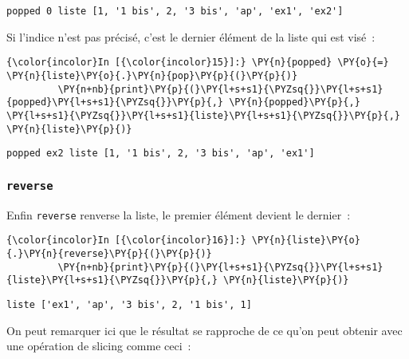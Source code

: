     \begin{Verbatim}[commandchars=\\\{\}]
popped 0 liste [1, '1 bis', 2, '3 bis', 'ap', 'ex1', 'ex2']

    \end{Verbatim}

    Si l'indice n'est pas précisé, c'est le dernier élément de la liste qui
est visé~:

    \begin{Verbatim}[commandchars=\\\{\}]
{\color{incolor}In [{\color{incolor}15}]:} \PY{n}{popped} \PY{o}{=} \PY{n}{liste}\PY{o}{.}\PY{n}{pop}\PY{p}{(}\PY{p}{)}
         \PY{n+nb}{print}\PY{p}{(}\PY{l+s+s1}{\PYZsq{}}\PY{l+s+s1}{popped}\PY{l+s+s1}{\PYZsq{}}\PY{p}{,} \PY{n}{popped}\PY{p}{,} \PY{l+s+s1}{\PYZsq{}}\PY{l+s+s1}{liste}\PY{l+s+s1}{\PYZsq{}}\PY{p}{,} \PY{n}{liste}\PY{p}{)}
\end{Verbatim}


    \begin{Verbatim}[commandchars=\\\{\}]
popped ex2 liste [1, '1 bis', 2, '3 bis', 'ap', 'ex1']

    \end{Verbatim}

    \hypertarget{reverse}{%
\subsubsection{\texorpdfstring{\texttt{reverse}}{reverse}}\label{reverse}}

    Enfin \texttt{reverse} renverse la liste, le premier élément devient le
dernier~:

    \begin{Verbatim}[commandchars=\\\{\}]
{\color{incolor}In [{\color{incolor}16}]:} \PY{n}{liste}\PY{o}{.}\PY{n}{reverse}\PY{p}{(}\PY{p}{)}
         \PY{n+nb}{print}\PY{p}{(}\PY{l+s+s1}{\PYZsq{}}\PY{l+s+s1}{liste}\PY{l+s+s1}{\PYZsq{}}\PY{p}{,} \PY{n}{liste}\PY{p}{)}
\end{Verbatim}


    \begin{Verbatim}[commandchars=\\\{\}]
liste ['ex1', 'ap', '3 bis', 2, '1 bis', 1]

    \end{Verbatim}

    On peut remarquer ici que le résultat se rapproche de ce qu'on peut
obtenir avec une opération de slicing comme ceci~:

